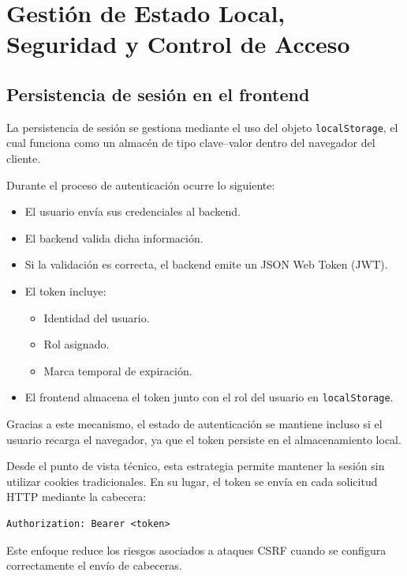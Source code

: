 \documentclass[12pt,letterpaper]{article}
\begin{document}
\section*{Gestión de Estado Local, Seguridad y Control de Acceso}

\subsection*{Persistencia de sesión en el frontend}

La persistencia de sesión se gestiona mediante el uso del objeto \texttt{localStorage}, el cual funciona como un almacén de tipo clave--valor dentro del navegador del cliente.

Durante el proceso de autenticación ocurre lo siguiente:

\begin{itemize}
    \item El usuario envía sus credenciales al backend.
    \item El backend valida dicha información.
    \item Si la validación es correcta, el backend emite un JSON Web Token (JWT).
    \item El token incluye:
    \begin{itemize}
        \item Identidad del usuario.
        \item Rol asignado.
        \item Marca temporal de expiración.
    \end{itemize}
    \item El frontend almacena el token junto con el rol del usuario en \texttt{localStorage}.
\end{itemize}

Gracias a este mecanismo, el estado de autenticación se mantiene incluso si el usuario recarga el navegador, ya que el token persiste en el almacenamiento local.

Desde el punto de vista técnico, esta estrategia permite mantener la sesión sin utilizar cookies tradicionales. En su lugar, el token se envía en cada solicitud HTTP mediante la cabecera:

\begin{verbatim}
Authorization: Bearer <token>
\end{verbatim}

Este enfoque reduce los riesgos asociados a ataques CSRF cuando se configura correctamente el envío de cabeceras.
\end{document}
